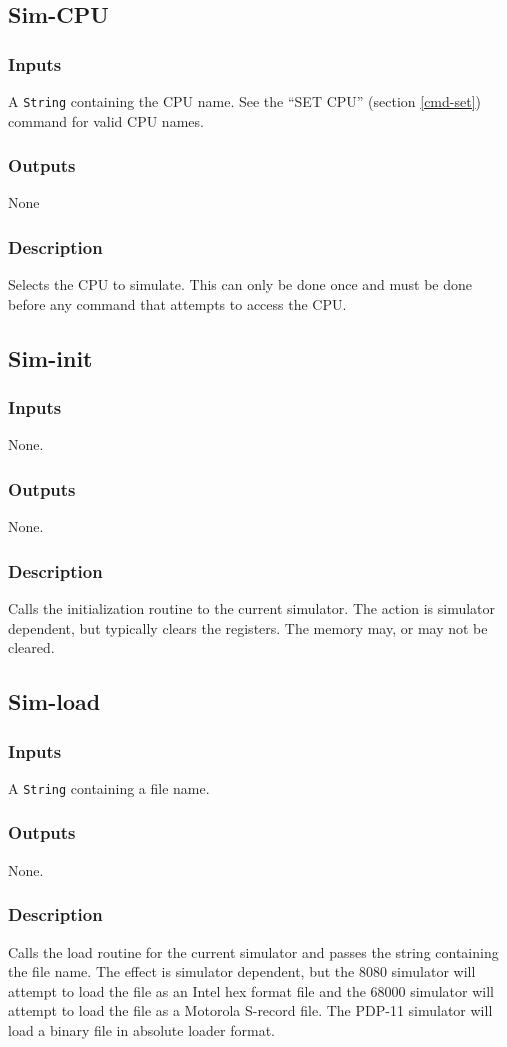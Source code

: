 \documentclass[10pt, openany]{book}
\newcommand{\datatype}[1]{\texttt{#1}}
\begin{document}
\subsection{Sim-CPU}
\subsubsection{Inputs}
A \datatype{String} containing the CPU name.
See the ``SET CPU'' (section \ref{cmd-set}) command for valid CPU names.
\subsubsection{Outputs}
None
\subsubsection{Description}
Selects the CPU to simulate.
This can only be done once and must be done before any command that attempts to access the CPU.

\subsection{Sim-init}
\subsubsection{Inputs}
None.
\subsubsection{Outputs}
None.
\subsubsection{Description}
Calls the initialization routine to the current simulator.
The action is simulator dependent, but typically clears the registers.
The memory may, or may not be cleared.

\subsection{Sim-load}
\subsubsection{Inputs}
A \datatype{String} containing a file name.
\subsubsection{Outputs}
None.
\subsubsection{Description}
Calls the load routine for the current simulator and passes the string containing the file name.
The effect is simulator dependent, but the 8080 simulator will attempt to load the file as an Intel hex format file and the 68000 simulator will attempt to load the file as a Motorola S-record file.
The PDP-11 simulator will load a binary file in absolute loader format.
\end{document}
